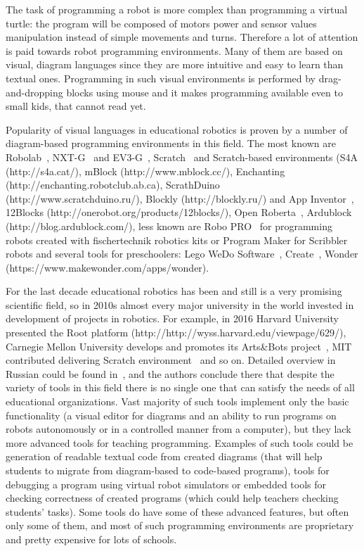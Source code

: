 \documentclass[conference]{IEEEtran}
\begin{document}
The task of programming a robot is more complex than programming a virtual turtle: the program will be composed of motors power and sensor values manipulation instead of simple movements and turns. Therefore a lot of attention is paid towards robot programming environments. Many of them are based on visual, diagram languages since they are more intuitive and easy to learn than textual ones. Programming in such visual environments is performed by drag-and-dropping blocks using mouse and it makes programming available even to small kids, that cannot read yet. 

Popularity of visual languages in educational robotics is proven by a number of diagram-based programming environments in this field. The most known are Robolab~\cite{erwin2000lego}, NXT-G~\cite{kelly2010lego} and EV3-G~\cite{valk2014lego}, Scratch~\cite{resnick2009scratch} and Scratch-based environments (S4A (http://s4a.cat/), mBlock (http://www.mblock.cc/), Enchanting (http://enchanting.robotclub.ab.ca), ScrathDuino (http://www.scratchduino.ru/), Blockly (http://blockly.ru/) and App Inventor~\cite{wolber2011app}, 12Blocks (http://onerobot.org/products/12blocks/), Open Roberta~\cite{jost2014graphical}, Ardublock (http://blog.ardublock.com/), less known are Robo PRO~\cite{chang2006incorporating} for programming robots created with fischertechnik robotics kits or Program Maker for Scribbler robots and several tools for preschoolers: Lego WeDo Software~\cite{mayerova2012pilot}, Create~\cite{cross2013visual}, Wonder (https://www.makewonder.com/apps/wonder).

For the last decade educational robotics has been and still is a very promising scientific field, so in 2010s almost every major university in the world invested in development of projects in robotics. For example, in 2016 Harvard University presented the Root platform (http://http://wyss.harvard.edu/viewpage/629/), Carnegie Mellon University develops and promotes its Arts\&Bots project~\cite{cross2013visual}, MIT contributed delivering Scratch environment~\cite{resnick2009scratch} and so on. Detailed overview in Russian could be found in~\cite{mordvinov2016NONPUBLISHED}, and the authors conclude there that despite the variety of tools in this field there is no single one that can satisfy the needs of all educational organizations. Vast majority of such tools implement only the basic functionality (a visual editor for diagrams and an ability to run programs on robots autonomously or in a controlled manner from a computer), but they lack more advanced tools for teaching programming. Examples of such tools could be generation of readable textual code from created diagrams (that will help students to migrate from diagram-based to code-based programs), tools for debugging a program using virtual robot simulators or embedded tools for checking correctness of created programs (which could help teachers checking students' tasks). Some tools do have some of these advanced features, but often only some of them, and most of such programming environments are proprietary and pretty expensive for lots of schools.
\end{document}
